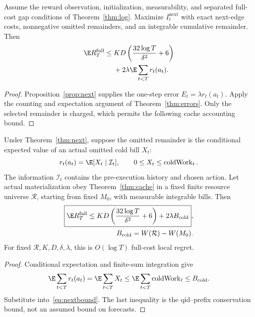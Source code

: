 \begin{theorem}
\label{thm:next}
Assume the reward observation, initialization, measurability, and separated full-cost gap conditions of Theorem~\ref{thm:log}. Maximize $I_t^{\mathrm{next}}$ with exact next-edge costs, nonnegative omitted remainders, and an integrable cumulative remainder. Then
\begin{equation}
\begin{split}
\E R_T^{\mathrm{full}}\le{}&KD\left(\frac{32\log T}{\delta^2}+6\right)\\
&+2\lambda\E\sum_{t<T}r_t(a_t).
\end{split}
\label{eq:nextbound}
\end{equation}
\end{theorem}
\begin{proof}
Proposition~\ref{prop:next} supplies the one-step error $E_t=\lambda r_t(a_t)$. Apply the counting and expectation argument of Theorem~\ref{thm:errors}. Only the selected remainder is charged, which permits the following cache accounting bound.
\end{proof}

\begin{theorem}
\label{thm:nextcache}
Under Theorem~\ref{thm:next}, suppose the omitted remainder is the conditional expected value of an actual omitted cold bill $X_t$:
\begin{equation}
r_t(a_t)=\E[X_t\mid\mathcal I_t],\qquad
0\le X_t\le\operatorname{coldWork}_t.
\label{eq:tailforecast}
\end{equation}
The information $\mathcal I_t$ contains the pre-execution history and chosen action. Let actual materialization obey Theorem~\ref{thm:cache} in a fixed finite resource universe $\mathcal R$, starting from fixed $M_0$, with measurable integrable bills. Then
\begin{equation}
\begin{split}
\boxed{\E R_T^{\mathrm{full}}\le
KD\left(\frac{32\log T}{\delta^2}+6\right)
+2\lambda B_{\mathrm{cold}}},\\
B_{\mathrm{cold}}=W(\mathcal R)-W(M_0).
\end{split}
\label{eq:nextcache}
\end{equation}
For fixed $\mathcal R,K,D,\delta,\lambda$, this is $O(\log T)$ full-cost local regret.
\end{theorem}
\begin{proof}
Conditional expectation and finite-sum integration give
\[
\E\sum_{t<T}r_t(a_t)=\E\sum_{t<T}X_t
\le\E\sum_{t<T}\operatorname{coldWork}_t\le B_{\mathrm{cold}}.
\]
Substitute into~\eqref{eq:nextbound}. The last inequality is the qid--prefix conservation bound, not an assumed bound on forecasts.
\end{proof}

